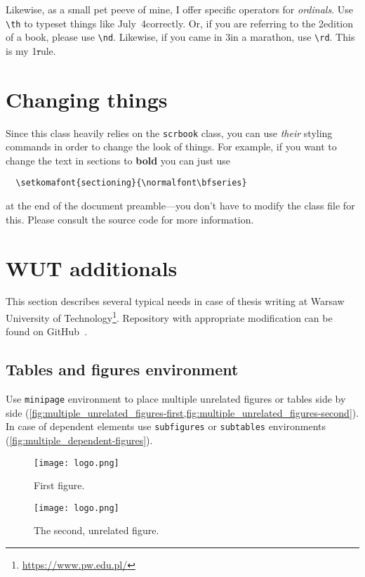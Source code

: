 Likewise, as a small pet peeve of mine, I offer specific operators for \emph{ordinals}. Use \verb|\th| to typeset things like July~4\th correctly. Or, if you are referring to the 2\nd edition of a book, please use \verb|\nd|. Likewise, if you came in 3\rd in a marathon, use \verb|\rd|. This is my 1\st rule.

\section{Changing things}

Since this class heavily relies on the \verb|scrbook| class, you can use
\emph{their} styling commands in order to change the look of things. For
example, if you want to change the text in sections to \textbf{bold} you
can just use
%
\begin{verbatim}
  \setkomafont{sectioning}{\normalfont\bfseries}
\end{verbatim}
%
at the end of the document preamble---you don't have to modify the class
file for this. Please consult the source code for more information.

\section{WUT additionals}

This section describes several typical needs in case of thesis writing at Warsaw University of Technology\footnote{\url{https://www.pw.edu.pl/}}. Repository with appropriate modification can be found on GitHub~\autocite{Rzepinski2019Fork}.

\subsection{Tables and figures environment}

Use \texttt{minipage} environment to place multiple unrelated figures or tables side by side (\cref{fig:multiple_unrelated_figures-first,fig:multiple_unrelated_figures-second}). In case of dependent elements use \texttt{subfigures} or \texttt{subtables} environments (\cref{fig:multiple_dependent-figures}).

\begin{figure}
	\begin{minipage}[t]{.4\textwidth}  
		\centering
		\texttt{[image: logo.png]}
		\caption{First figure.}
		\label{fig:multiple_unrelated_figures-first}
	\end{minipage}%
	\hfill
	\begin{minipage}[t]{0.4\textwidth}  
		\centering
		\texttt{[image: logo.png]}
		\caption{The second, unrelated figure.}
		\label{fig:multiple_unrelated_figures-second}
	\end{minipage}
\end{figure}

